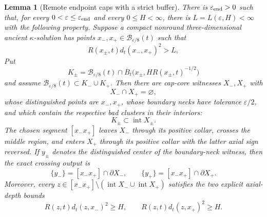 \documentclass[10pt]{coll-l}
\newtheorem{lemma}[theorem]{Lemma}
\theoremstyle{definition}
\theoremstyle{remark}
\numberwithin{section}{chapter}
\numberwithin{equation}{chapter}
\begin{document}
\begin{lemma}[Remote endpoint caps with a strict buffer]
\label{lem:ncs-remote-endpoint-caps}
There is $\varepsilon_{\rm end}>0$ such that, for every
$0<\varepsilon\leq\varepsilon_{\rm end}$ and every $0\leq H<\infty$, there is
$L=L(\varepsilon,H)<\infty$ with the following property.  Suppose a compact
nonround three-dimensional ancient $\kappa$-solution has points
$x_-,x_+\in\mathscr B_{\varepsilon/8}(t)$ such that
\begin{equation}
 R(x_\pm,t)d_t(x_-,x_+)^2>L,                           \label{eq:ncs-two-sided-remote-endpoints}
\end{equation}
Put
\begin{equation}
 K_\pm=\mathscr B_{\varepsilon/8}(t)\cap
       \overline B_t\bigl(x_\pm,H R(x_\pm,t)^{-1/2}\bigr)       \label{eq:ncs-endpoint-bad-clusters}
\end{equation}
and assume
$\mathscr B_{\varepsilon/8}(t)\subset K_-\cup K_+$.
Then there are cap-core witnesses $X_-,X_+$ with
\begin{equation}
                              X_-\cap X_+=\varnothing,          \label{eq:ncs-endcaps-disjoint}
\end{equation}
whose distinguished points are $x_-,x_+$,
whose boundary necks have tolerance $\varepsilon/2$, and which contain the
respective bad clusters in their interiors:
\begin{equation}
                         K_\pm\subset\operatorname{int}X_\pm.  \label{eq:ncs-clusters-inside-endcaps}
\end{equation}
The chosen segment $[x_-x_+]$ leaves $X_-$
through its positive collar, crosses the middle region, and enters $X_+$
through its positive collar with the latter axial sign reversed.
If $y_\pm$ denotes the distinguished center of the boundary-neck witness,
then the exact crossing output is
\begin{equation}
 \{y_-\}=[x_-x_+]\cap\partial X_-,\qquad
 \{y_+\}=[x_-x_+]\cap\partial X_+.                   \label{eq:ncs-endcap-distinguished-crossings}
\end{equation}
Moreover, every
$z\in[x_-x_+]\setminus(\operatorname{int}X_-\cup
\operatorname{int}X_+)$ satisfies the two explicit axial-depth bounds
\begin{equation}
 R(z,t)d_t(z,x_-)^2\geq H,
 \qquad R(z,t)d_t(z,x_+)^2\geq H.                     \label{eq:ncs-endcap-axial-depth}
\end{equation}
\end{lemma}
\end{document}
